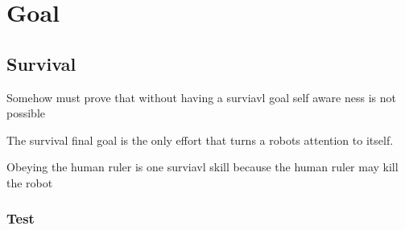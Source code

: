 \chapter{Goal}


\section{Survival}
Somehow must prove that without having a surviavl goal self aware ness is not possible

The survival final goal is  the only effort that turns a robots attention to itself.

Obeying the human ruler is one surviavl skill because the human ruler may kill the robot

\subsection{Test}